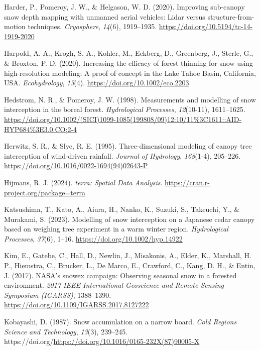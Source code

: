 \documentclass[
  letterpaper,
  DIV=11,
  numbers=noendperiod]{scrartcl}
\newlength{\cslhangindent}
\newenvironment{CSLReferences}[2] %
 {\begin{list}{}{%
  \setlength{\itemindent}{0pt}
  \setlength{\leftmargin}{0pt}
  \setlength{\parsep}{0pt}
  \ifodd #1
   \setlength{\leftmargin}{\cslhangindent}
   \setlength{\itemindent}{-1\cslhangindent}
  \fi
  \setlength{\itemsep}{#2\baselineskip}}}
 {\end{list}}
\begin{document}
\begin{CSLReferences}{1}{0}
Harder, P., Pomeroy, J. W., \& Helgason, W. D. (2020). {Improving
sub-canopy snow depth mapping with unmanned aerial vehicles: Lidar
versus structure-from-motion techniques}. \emph{Cryosphere},
\emph{14}(6), 1919--1935. \url{https://doi.org/10.5194/tc-14-1919-2020}

Harpold, A. A., Krogh, S. A., Kohler, M., Eckberg, D., Greenberg, J.,
Sterle, G., \& Broxton, P. D. (2020). {Increasing the efficacy of forest
thinning for snow using high-resolution modeling: A proof of concept in
the Lake Tahoe Basin, California, USA}. \emph{Ecohydrology},
\emph{13}(4). \url{https://doi.org/10.1002/eco.2203}

Hedstrom, N. R., \& Pomeroy, J. W. (1998). {Measurements and modelling
of snow interception in the boreal forest}. \emph{Hydrological
Processes}, \emph{12}(10-11), 1611--1625.
\url{https://doi.org/10.1002/(SICI)1099-1085(199808/09)12:10/11\%3C1611::AID-HYP684\%3E3.0.CO;2-4}

Herwitz, S. R., \& Slye, R. E. (1995). {Three-dimensional modeling of
canopy tree interception of wind-driven rainfall}. \emph{Journal of
Hydrology}, \emph{168}(1-4), 205--226.
\url{https://doi.org/10.1016/0022-1694(94)02643-P}

Hijmans, R. J. (2024). \emph{{terra: Spatial Data Analysis}}.
\url{https://cran.r-project.org/package=terra}

Katsushima, T., Kato, A., Aiura, H., Nanko, K., Suzuki, S., Takeuchi,
Y., \& Murakami, S. (2023). {Modelling of snow interception on a
Japanese cedar canopy based on weighing tree experiment in a warm winter
region}. \emph{Hydrological Processes}, \emph{37}(6), 1--16.
\url{https://doi.org/10.1002/hyp.14922}

Kim, E., Gatebe, C., Hall, D., Newlin, J., Misakonis, A., Elder, K.,
Marshall, H. P., Hiemstra, C., Brucker, L., De Marco, E., Crawford, C.,
Kang, D. H., \& Entin, J. (2017). {NASA's snowex campaign: Observing
seasonal snow in a forested environment}. \emph{2017 IEEE International
Geoscience and Remote Sensing Symposium (IGARSS)}, 1388--1390.
\url{https://doi.org/10.1109/IGARSS.2017.8127222}

Kobayashi, D. (1987). {Snow accumulation on a narrow board}. \emph{Cold
Regions Science and Technology}, \emph{13}(3), 239--245.
https://doi.org/\url{https://doi.org/10.1016/0165-232X(87)90005-X}


\end{CSLReferences}
\end{document}
